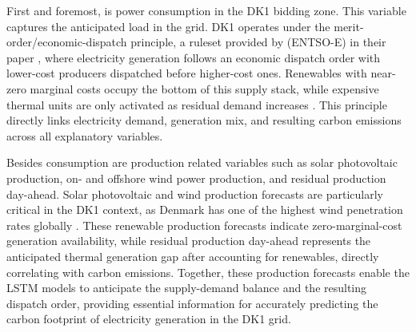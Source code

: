 First and foremost, is power consumption in the DK1 bidding zone. This variable captures the anticipated load in the grid. DK1 operates under the merit-order/economic-dispatch principle, a ruleset provided by \citeauthor{entsoe2021} (ENTSO-E) in their paper , where electricity generation follows an economic dispatch order with lower-cost producers dispatched before higher-cost ones. Renewables with near-zero marginal costs occupy the bottom of this supply stack, while expensive thermal units are only activated as residual demand increases \parencite{roungkvist2020}. This principle directly links electricity demand, generation mix, and resulting carbon emissions across all explanatory variables.

Besides consumption are production related variables such as solar photovoltaic production, on- and offshore wind power production, and residual production day-ahead. Solar photovoltaic and wind production forecasts are particularly critical in the DK1 context, as Denmark has one of the highest wind penetration rates globally \parencite{wang2017,iea2023}. These renewable production forecasts indicate zero-marginal-cost generation availability, while residual production day-ahead represents the anticipated thermal generation gap after accounting for renewables, directly correlating with carbon emissions. Together, these production forecasts enable the LSTM models to anticipate the supply-demand balance and the resulting dispatch order, providing essential information for accurately predicting the carbon footprint of electricity generation in the DK1 grid.

